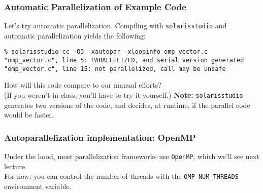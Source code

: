 \documentclass[aspectratio=43]{beamer}
\newenvironment{changemargin}[1]{%
  \begin{list}{}{%
    \setlength{\topsep}{0pt}%
    \setlength{\leftmargin}{#1}%
    \setlength{\rightmargin}{1em}
    \setlength{\listparindent}{\parindent}%
    \setlength{\itemindent}{\parindent}%
    \setlength{\parsep}{\parskip}%
  }%
  \item[]}{\end{list}}
\begin{document}
\begin{frame}[fragile]
  \frametitle{Automatic Parallelization of Example Code}

\begin{changemargin}{1.5cm}
  Let's try automatic parallelization.
  \vfill
  Compiling with {\tt solarisstudio} and automatic parallelization yields
  the following:
\end{changemargin}

{\scriptsize
  \begin{lstlisting}
% solarisstudio-cc -O3 -xautopar -xloopinfo omp_vector.c 
"omp_vector.c", line 5: PARALLELIZED, and serial version generated                 
"omp_vector.c", line 15: not parallelized, call may be unsafe
  \end{lstlisting}
}
\begin{changemargin}{1.5cm}
  How will this code compare to our manual efforts? \\
  (If you weren't in class, you'll have to try it yourself.)
  \vfill
  {\bf Note:} {\tt solarisstudio} generates two versions of the code, 
  and decides, at runtime, if the parallel code would be faster.
\end{changemargin}

\end{frame}


\begin{frame}
  \frametitle{Autoparallelization implementation: OpenMP}

\begin{changemargin}{1.5cm}
  Under the hood, most parallelization frameworks use {\tt OpenMP},
      which we'll see next lecture.\\[1em]
  For now: you can control the number of threads with the
      {\tt OMP\_NUM\_THREADS} environment variable.\\[1em]
\end{changemargin}
\end{frame}
\end{document}
